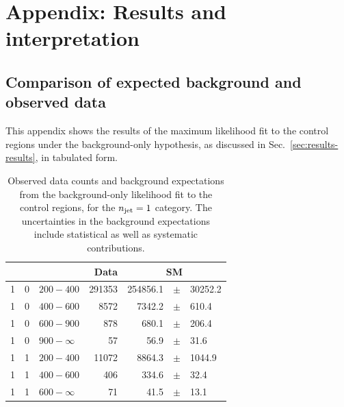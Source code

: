 \chapter{Appendix: Results and interpretation}
\label{app:results}

\section{Comparison of expected background and observed data}
\label{app:results-results}
This appendix shows the results of the maximum likelihood fit to the control 
regions under the background-only hypothesis, as discussed in 
Sec.~\ref{sec:results-results}, in tabulated form.

\clearpage
\begin{table}[!h]
	\caption{
		Observed data counts and background expectations from the 
		background-only likelihood fit to the control regions, for the 
		$n_{\text{jet}}=1$ category. The uncertainties in the background expectations 
		include statistical as well as systematic contributions. 
	}
	\label{tab:cronly_sr_result-eq1j}
	\scriptsize
	\centering
	\begin{tabular}{rrlrrcl}
		\hline
		\njet\T\B & \nb & \scalht [GeV] & Data & \multicolumn{3}{c}{SM} \\ 
		\hline
		1\T & 0 & $ 200- 400$ & 291353 & 254856.1 &$\pm$& 30252.2 \\
		1\T & 0 & $ 400- 600$ &   8572 &   7342.2 &$\pm$&  610.4 \\
		1\T & 0 & $ 600- 900$ &    878 &    680.1 &$\pm$&  206.4 \\
		1\T & 0 & $ 900- \infty$ &     57 &     56.9 &$\pm$&   31.6 \\
		1\T & 1 & $ 200- 400$ &  11072 &   8864.3 &$\pm$& 1044.9 \\
		1\T & 1 & $ 400- 600$ &    406 &    334.6 &$\pm$&   32.4 \\
		1\T & 1 & $ 600- \infty$ &     71 &     41.5 &$\pm$&   13.1 \\
		\hline
	\end{tabular}
\end{table}

